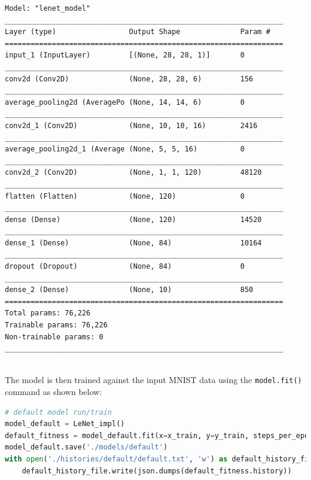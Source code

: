 \documentclass{article}
\begin{document}
\begin{lstlisting}
Model: "lenet_model"
_________________________________________________________________
Layer (type)                 Output Shape              Param #   
=================================================================
input_1 (InputLayer)         [(None, 28, 28, 1)]       0         
_________________________________________________________________
conv2d (Conv2D)              (None, 28, 28, 6)         156       
_________________________________________________________________
average_pooling2d (AveragePo (None, 14, 14, 6)         0         
_________________________________________________________________
conv2d_1 (Conv2D)            (None, 10, 10, 16)        2416      
_________________________________________________________________
average_pooling2d_1 (Average (None, 5, 5, 16)          0         
_________________________________________________________________
conv2d_2 (Conv2D)            (None, 1, 1, 120)         48120     
_________________________________________________________________
flatten (Flatten)            (None, 120)               0         
_________________________________________________________________
dense (Dense)                (None, 120)               14520     
_________________________________________________________________
dense_1 (Dense)              (None, 84)                10164     
_________________________________________________________________
dropout (Dropout)            (None, 84)                0         
_________________________________________________________________
dense_2 (Dense)              (None, 10)                850       
=================================================================
Total params: 76,226
Trainable params: 76,226
Non-trainable params: 0
_________________________________________________________________
\end{lstlisting}

\\The model is then trained against the input MNIST data using the \lstinline{model.fit()} command as shown below:

\begin{lstlisting}[language=Python]
# default model run/train
model_default = LeNet_impl()
default_fitness = model_default.fit(x=x_train, y=y_train, steps_per_epoch=128, epochs=500, verbose=1, validation_data=(x_test, y_test))
model_default.save('./models/default')
with open('./histories/default/default.txt', 'w') as default_history_file:
    default_history_file.write(json.dumps(default_fitness.history))
\end{lstlisting}
\end{document}
